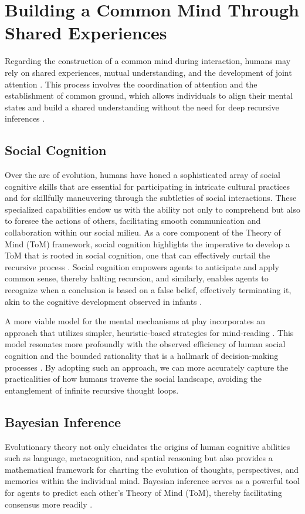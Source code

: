 \documentclass{article}
\begin{document}
\section{Building a Common Mind Through Shared Experiences}
Regarding the construction of a common mind during interaction, humans may rely on shared experiences, mutual understanding, and the development of joint attention \citep{Tomasello2018}. This process involves the coordination of attention and the establishment of common ground, which allows individuals to align their mental states and build a shared understanding without the need for deep recursive inferences \citep{Sebanz2003}.

\subsection{Social Cognition}

Over the arc of evolution, humans have honed a sophisticated array of social cognitive skills that are essential for participating in intricate cultural practices and for skillfully maneuvering through the subtleties of social interactions. These specialized capabilities endow us with the ability not only to comprehend but also to foresee the actions of others, facilitating smooth communication and collaboration within our social milieu. As a core component of the Theory of Mind (ToM) framework, social cognition highlights the imperative to develop a ToM that is rooted in social cognition, one that can effectively curtail the recursive process \citep{herrmann2007humans}. Social cognition empowers agents to anticipate and apply common sense, thereby halting recursion, and similarly, enables agents to recognize when a conclusion is based on a false belief, effectively terminating it, akin to the cognitive development observed in infants \citep{houde2022cambridge}.

A more viable model for the mental mechanisms at play incorporates an approach that utilizes simpler, heuristic-based strategies for mind-reading \citep{murphy2009beyond}. This model resonates more profoundly with the observed efficiency of human social cognition and the bounded rationality that is a hallmark of decision-making processes \citep{Simon1997}. By adopting such an approach, we can more accurately capture the practicalities of how humans traverse the social landscape, avoiding the entanglement of infinite recursive thought loops.

\subsection{Bayesian Inference}
Evolutionary theory not only elucidates the origins of human cognitive abilities such as language, metacognition, and spatial reasoning but also provides a mathematical framework for charting the evolution of thoughts, perspectives, and memories within the individual mind. Bayesian inference serves as a powerful tool for agents to predict each other's Theory of Mind (ToM), thereby facilitating consensus more readily \citep{suchow2017evolution}.
\end{document}
